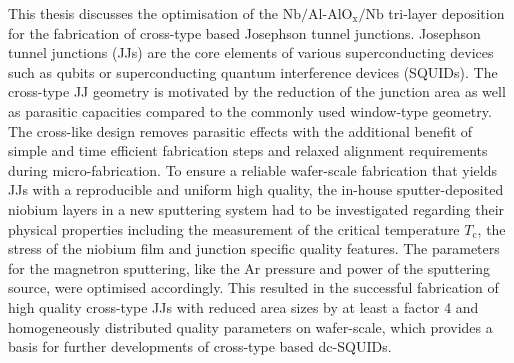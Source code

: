 \noindent
This thesis discusses the optimisation of the $\mathrm{Nb}/\mathrm{Al}$-$\mathrm{AlO}_\mathrm{x}/\mathrm{Nb}$ tri-layer deposition for the fabrication of cross-type based Josephson tunnel junctions. Josephson tunnel junctions (JJs) are the core elements of various superconducting devices such as qubits or superconducting quantum interference devices (SQUIDs). The cross-type JJ geometry is motivated by the reduction of the junction area as well as parasitic capacities compared to the commonly used window-type geometry. The cross-like design removes parasitic effects with the additional benefit of simple and time efficient fabrication steps and relaxed alignment requirements during micro-fabrication. To ensure a reliable wafer-scale fabrication that yields JJs with a reproducible and uniform high quality, the in-house sputter-deposited niobium layers in a new sputtering system had to be investigated regarding their physical properties including the measurement of the critical temperature $T_{\mathrm{c}}$, the stress of the niobium film and junction specific quality features. The parameters for the magnetron sputtering, like the Ar pressure and power of the sputtering source, were optimised accordingly. This resulted in the successful fabrication of high quality cross-type JJs with reduced area sizes by at least a factor 4 and homogeneously distributed quality parameters on wafer-scale, which provides a basis for further developments of cross-type based dc-SQUIDs.



% 
